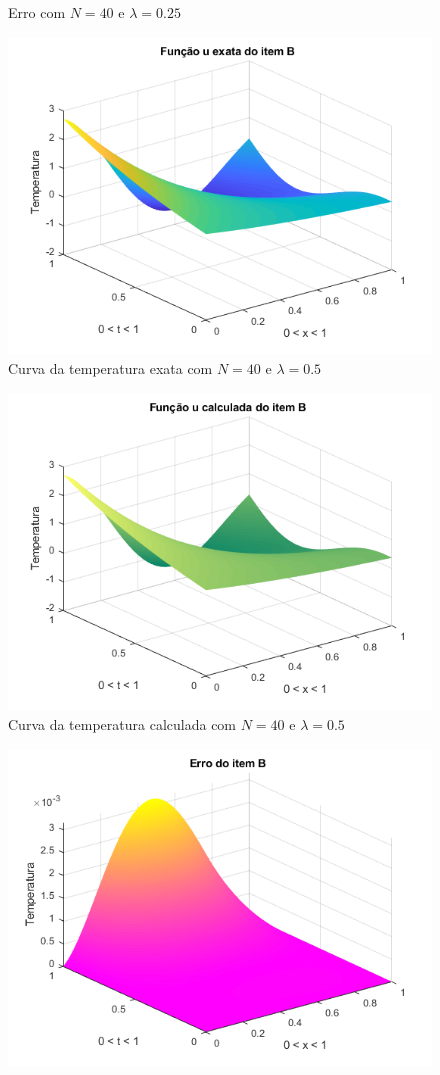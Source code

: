 \documentclass[12pt]{article}
\begin{document}
\begin{spacing}{1.5}
\begin{figure}
    \caption{Erro com $N=40$ e $\lambda=0.25$}
    \label{fig:B_n40lambda0-25_erro}
\end{figure}
\begin{figure}
    \centering
    \includegraphics[width=0.8\linewidth]{Primeira_Tarefa/ItemB/n40_lambda0-5_exata.png}
    \caption{Curva da temperatura exata com $N=40$ e $\lambda=0.5$}
    \label{fig:B_n40lambda0-5_exata}
\end{figure}
\begin{figure}
    \centering
    \includegraphics[width=0.8\linewidth]{Primeira_Tarefa/ItemB/n40_lambda0-5_calc.png}
    \caption{Curva da temperatura calculada com $N=40$ e $\lambda=0.5$}
    \label{fig:B_n40lambda0-5_calc}
\end{figure}
\begin{figure}
    \centering
    \includegraphics[width=0.8\linewidth]{Primeira_Tarefa/ItemB/n40_lambda0-5_erro.png}

\end{figure}
\end{spacing}
\end{document}
